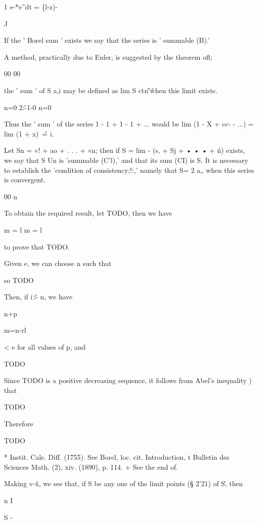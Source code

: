 1 e-*e''dt = \{l-z)-\

J

If the ' Borel sum ' exists we say that the series is ' summable (B).'

 A method, practically due
to Euler, is suggested by the theorem ofl;

00 00

the ' sum ' of S a,i may be defined as lim S ctn\^'\^ when this limit
exists.

n=0 2:\^-1-0 n=0

Thus the ' sum ' of the series 1 - 1 + 1 - 1 + ... would be lim (1 - X
+ cc- - ...) = lim (1 + x)~\^ = i.


Let Sn = «! + ao + . . . + «n; then if S = lim - (s, + Sj + • • • +
\^n) exists, we say that S Un is 'summable (C'l),' and that its sum
(CI) is S. It is necessary to establish the 'condition of
consistency;!:,' namely that S= 2 a„ when this series is convergent.

00 n

To obtain the required result, let TODO, then we have

m = l m = l

to prove that TODO.

Given e, we can choose n such that

so TODO

Then, if i\^ > n, we have

n+p


m=n-rl

< e for all values of p, and

TODO

Since TODO is a positive decreasing sequence, it follows from Abel's
inequality ) that

TODO

Therefore

TODO

* Instit. Cale. Diff. (1755). See Borel, loc. cit. Introduction, t
Bulletin des Sciences Math. (2), xiv. (1890), p. 114. + See the end of.

%
%
Making v-\^x, we see that, if S be any one of the limit points (§
2'21) of S\^, then

n I

S - %

